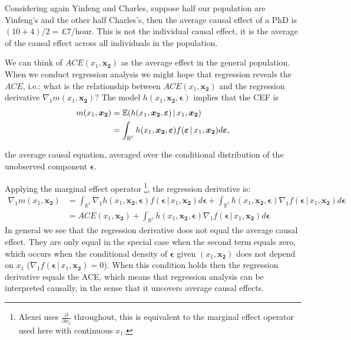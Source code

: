 \documentclass[DIV=14,titlepage=false]{scrreprt}
\begin{document}
\begin{example}
Considering again Yinfeng and Charles, suppose half our population are Yinfeng's and the other half Charles's, then the average causal effect of a PhD is $(10+4)/2=$£$7$/hour. This is not the individual causal effect, it is the average of the causal effect across all individuals in the population.
\end{example}
We can think of $ACE(x_1, \mathbf{x_2})$ as the average effect in the general population. When we conduct regression analysis we might hope that regression reveals the $ACE$, i.e.: what is the relationship between $ACE(x_1, \mathbf{x_2})$ and the regression derivative $\nabla_1 m(x_1, \mathbf{x_2})$? The model $h(x_1, \mathbf{x_2},\boldsymbol{\epsilon})$ implies that the CEF is
\begin{align*}
m(x_1, \boldsymbol{x_2}) &= \mathbb{E}(h(x_1, \boldsymbol{x_2}, \boldsymbol{\varepsilon}) \, | \, x_1, \boldsymbol{x_2})\\
&= \int_{\mathbb{R}^{\ell}} h(x_1, \boldsymbol{x_2}, \boldsymbol{\varepsilon}) f(\boldsymbol{\varepsilon} \, | \, x_1, \boldsymbol{x_2}) d\boldsymbol{\varepsilon},
\end{align*}

the average causal equation, averaged over the conditional distribution of the unobserved component $\boldsymbol{\epsilon}$. 

Applying the marginal effect operator \footnote[1]{Alexei uses $\frac{\partial}{\partial x_1}$ throughout, this is equivalent to the marginal effect operator used here with continuous $x_1$.}, the regression derivative is:
\begin{align*}
\nabla_1 m(x_1, \boldsymbol{x_2}) &= \int_{\mathbb{R}^{\ell}} \nabla_1 h(x_1, \boldsymbol{x_2}, \boldsymbol{\epsilon}) f(\boldsymbol{\epsilon} \, | \, x_1, \boldsymbol{x_2}) d\boldsymbol{\epsilon} + \int_{\mathbb{R}^{\ell}} h(x_1, \boldsymbol{x_2}, \boldsymbol{\epsilon}) \nabla_1 f(\boldsymbol{\epsilon} \, | \, x_1, \boldsymbol{x_2}) d\boldsymbol{\epsilon}\\
&= ACE(x_1, \boldsymbol{x_2}) + \int_{\mathbb{R}^{\ell}} h(x_1, \boldsymbol{x_2}, \boldsymbol{\epsilon}) \nabla_1 f(\boldsymbol{\epsilon} \, | \, x_1, \boldsymbol{x_2}) d\boldsymbol{\epsilon}
\end{align*}
In general we see that the regression derivative does not equal the average causal effect. They are only equal in the special case when the second term equals zero, which occurs when the conditional density of $\boldsymbol{\epsilon}$ given $( x_1, \boldsymbol{x_2})$ does not depend on $x_1$ ($\nabla_1 f(\boldsymbol{\epsilon} \, | \, x_1, \boldsymbol{x_2})=0$). When this condition holds then the regression derivative equals the ACE, which means that regression analysis can be interpreted causally, in the sense that it uncovers average causal effects.\\
\end{document}
